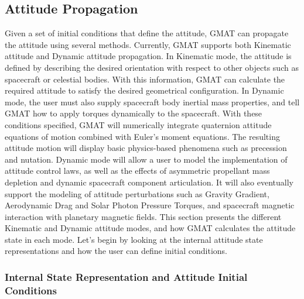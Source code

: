 \subsection{Attitude Propagation}

Given a set of initial conditions that define the attitude, GMAT can propagate
the attitude using several methods.  Currently, GMAT supports both Kinematic
attitude and Dynamic attitude propagation.  In Kinematic mode, the attitude is
defined by describing the desired orientation with respect to other objects such
as spacecraft or celestial bodies.  With this information, GMAT can calculate
the required attitude to satisfy the desired geometrical configuration.  In
Dynamic mode, the user must also supply spacecraft body inertial mass properties,
and tell GMAT how to apply torques dynamically to the spacecraft.  With these
conditions specified, GMAT will numerically integrate quaternion attitude
equations of motion combined with Euler's moment equations.  The resulting
attitude motion will display basic physics-based phenomena such as precession
and nutation.  Dynamic mode will allow a user to model the implementation of
attitude control laws, as well as the effects of asymmetric propellant mass
depletion and dynamic spacecraft component articulation.  It will also
eventually support the modeling of attitude perturbations such as Gravity
Gradient, Aerodynamic Drag and Solar Photon Pressure Torques, and spacecraft
magnetic interaction with planetary magnetic fields.  This section presents the
different Kinematic and Dynamic attitude modes, and how GMAT calculates the
attitude state in each mode.  Let's begin by looking at the internal attitude
state representations and how the user can define initial conditions.

\vspace{- .1 in} \subsubsection{Internal State Representation and Attitude
Initial Conditions}

